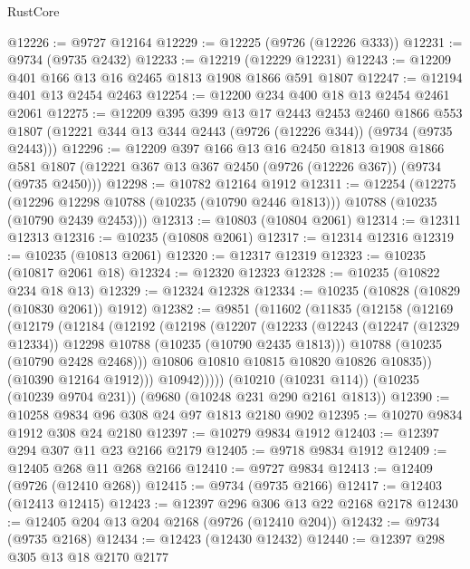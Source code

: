 \begin{lexlean}{RustCore}
\begin{coremodule}
@12226 := @9727 @12164
@12229 := @12225 (@9726 (@12226 @333))
@12231 := @9734 (@9735 @2432)
@12233 := @12219 (@12229 @12231)
@12243 := @12209 @401 @166 @13 @16 @2465 @1813 @1908 @1866 @591 @1807
@12247 := @12194 @401 @13 @2454 @2463
@12254 := @12200 @234 @400 @18 @13 @2454 @2461 @2061
@12275 := @12209
    @395
    @399
    @13
    @17
    @2443
    @2453
    @2460
    @1866
    @553
    @1807
    (@12221 @344 @13 @344 @2443 (@9726 (@12226 @344)) (@9734 (@9735 @2443)))
@12296 := @12209
    @397
    @166
    @13
    @16
    @2450
    @1813
    @1908
    @1866
    @581
    @1807
    (@12221 @367 @13 @367 @2450 (@9726 (@12226 @367)) (@9734 (@9735 @2450)))
@12298 := @10782 @12164 @1912
@12311 := @12254
    (@12275
      (@12296 @12298 @10788 (@10235 (@10790 @2446 @1813)))
      @10788
      (@10235 (@10790 @2439 @2453)))
@12313 := @10803 (@10804 @2061)
@12314 := @12311 @12313
@12316 := @10235 (@10808 @2061)
@12317 := @12314 @12316
@12319 := @10235 (@10813 @2061)
@12320 := @12317 @12319
@12323 := @10235 (@10817 @2061 @18)
@12324 := @12320 @12323
@12328 := @10235 (@10822 @234 @18 @13)
@12329 := @12324 @12328
@12334 := @10235 (@10828 (@10829 (@10830 @2061)) @1912)
@12382 := @9851
    (@11602
      (@11835
        (@12158
          (@12169
            (@12179
              (@12184
                (@12192
                  (@12198
                    (@12207
                      (@12233
                        (@12243
                          (@12247 (@12329 @12334))
                          @12298
                          @10788
                          (@10235 (@10790 @2435 @1813)))
                        @10788
                        (@10235 (@10790 @2428 @2468)))
                      @10806
                      @10810
                      @10815
                      @10820
                      @10826
                      @10835))
                  (@10390 @12164 @1912)))
              @10942)))))
    (@10210 (@10231 @114))
    (@10235 (@10239 @9704 @231))
    (@9680 (@10248 @231 @290 @2161 @1813))
@12390 := @10258 @9834 @96 @308 @24 @97 @1813 @2180 @902
@12395 := @10270 @9834 @1912 @308 @24 @2180
@12397 := @10279 @9834 @1912
@12403 := @12397 @294 @307 @11 @23 @2166 @2179
@12405 := @9718 @9834 @1912
@12409 := @12405 @268 @11 @268 @2166
@12410 := @9727 @9834
@12413 := @12409 (@9726 (@12410 @268))
@12415 := @9734 (@9735 @2166)
@12417 := @12403 (@12413 @12415)
@12423 := @12397 @296 @306 @13 @22 @2168 @2178
@12430 := @12405 @204 @13 @204 @2168 (@9726 (@12410 @204))
@12432 := @9734 (@9735 @2168)
@12434 := @12423 (@12430 @12432)
@12440 := @12397 @298 @305 @13 @18 @2170 @2177

\end{coremodule}
\end{lexlean}
